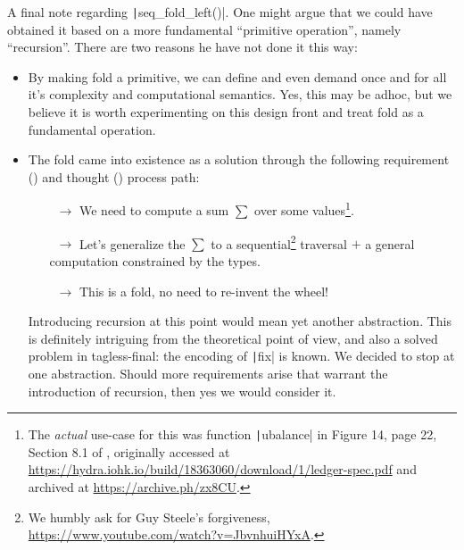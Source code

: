 \documentclass[11pt]{article}
\newcommand{\ScalaI}[1]{\texttt|#1|}
\newcommand{\TextI}[1]{\texttt|#1|}
\begin{document}
A final note regarding \ScalaI{seq_fold_left()}. One might argue that we 
could have obtained it based on a more fundamental ``primitive operation'', 
namely ``recursion''. There are two reasons he have not done it this way:
\begin{itemize}
  \item By making fold a primitive, we can define and even demand once and 
  for all it's complexity and computational semantics. Yes, this may be 
  adhoc, but we believe it is worth experimenting on this design front and 
  treat fold as a fundamental operation.
  
  \item The fold came into existence as a solution through the following 
  requirement (\faBook) and thought (\faLightbulbO) process path:
  \begin{itemize}
    \item[\faBook~$\longrightarrow$] We need to compute a sum $\sum$ over 
    some values\footnote{The \textit{actual} use-case for this was function 
    \TextI{ubalance} in Figure 14, page 22, Section 8.1 of 
    \cite{cardano:ledger-spec:shelley:2019}, originally accessed at 
    \href{https://hydra.iohk.io/build/18363060/download/1/ledger-spec.pdf}{https://hydra.iohk.io/build/18363060/download/1/ledger-spec.pdf}
     and archived at 
    \href{https://archive.ph/zx8CU}{https://archive.ph/zx8CU}.}.
  
    \item[\faLightbulbO~$\longrightarrow$] Let's generalize the $\sum$ to a 
    sequential\footnote{We humbly ask for Guy Steele's forgiveness, 
    \href{https://www.youtube.com/watch?v=JbvnhuiHYxA}{https://www.youtube.com/watch?v=JbvnhuiHYxA}.}
     traversal $+$ a general computation constrained by the types.
    
    \item[\faLightbulbO~$\longrightarrow$] This is a fold, no need to 
    re-invent the wheel!
  \end{itemize}
  
    Introducing recursion at this point would mean yet another abstraction. 
    This is definitely intriguing from the theoretical point of view, and 
    also a solved problem in tagless-final: the encoding of \TextI{fix} is 
    known. We decided to stop at one abstraction. Should more requirements 
    arise that warrant the introduction of recursion, then yes we would 
    consider it.
\end{itemize}


\end{document}
